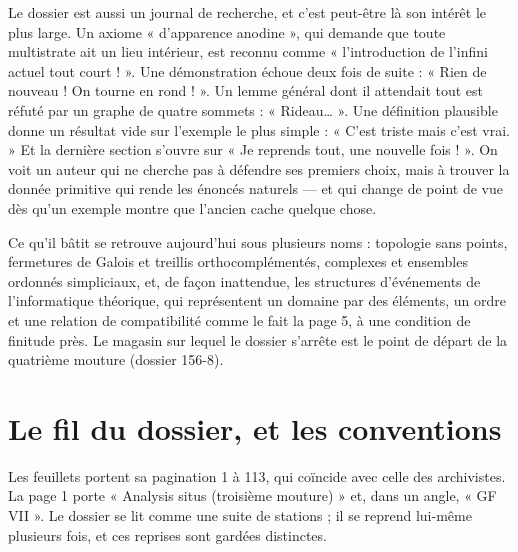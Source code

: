 \documentclass[11pt,a4paper]{article}
\begin{document}
\begin{resume}
Le dossier est aussi un journal de recherche, et c'est peut-être là son
intérêt le plus large. Un axiome « d'apparence anodine », qui demande que
toute multistrate ait un lieu intérieur, est reconnu comme « l'introduction de
l'infini actuel tout court ! ». Une démonstration échoue deux fois de suite :
« Rien de nouveau ! On tourne en rond ! ». Un lemme général dont il attendait
tout est réfuté par un graphe de quatre sommets : « Rideau… ». Une définition
plausible donne un résultat vide sur l'exemple le plus simple : « C'est triste
mais c'est vrai. » Et la dernière section s'ouvre sur « Je reprends tout, une
nouvelle fois ! ». On voit un auteur qui ne cherche pas à défendre ses
premiers choix, mais à trouver la donnée primitive qui rende les énoncés
naturels --- et qui change de point de vue dès qu'un exemple montre que l'ancien
cache quelque chose.

Ce qu'il bâtit se retrouve aujourd'hui sous plusieurs noms : topologie sans
points, fermetures de Galois et treillis orthocomplémentés, complexes et
ensembles ordonnés simpliciaux, et, de façon inattendue, les structures
d'événements de l'informatique théorique, qui représentent un domaine par des
éléments, un ordre et une relation de compatibilité comme le fait la page 5, à une
condition de finitude près. Le magasin sur lequel le dossier s'arrête est le point de départ de
la quatrième mouture (dossier 156-8).

\end{resume}

\section*{Le fil du dossier, et les conventions}

Les feuillets portent sa pagination 1 à 113, qui coïncide avec celle des
archivistes. La page 1 porte « Analysis situs (troisième mouture) » et, dans un
angle, « GF VII ». Le dossier se lit comme une suite de stations ; il se
reprend lui-même plusieurs fois, et ces reprises sont gardées distinctes.
\end{document}
